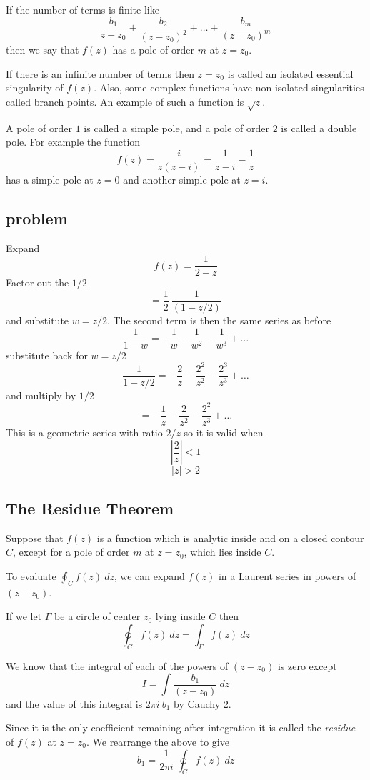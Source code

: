 \documentclass[11pt, oneside]{article}   	%
\begin{document}
If the number of terms is finite like
\[ \frac{b_1}{z-z_0} + \frac{b_2}{(z-z_0)^2} + \dots + \frac{b_m}{(z-z_0)^m} \]
then we say that $f(z)$ has a pole of order $m$ at $ z = z_0$.

If there is an infinite number of terms then $z = z_0$ is called an isolated essential singularity of $f(z)$.  Also, some complex functions have non-isolated singularities called branch points. An example of such a function is $\sqrt{z}$.

A pole of order $1$ is called a simple pole, and a pole of order $2$ is called a double pole.  For example the function
\[ f(z) = \frac{i}{z(z-i)} = \frac{1}{z-i} - \frac{1}{z} \]
has a simple pole at $z = 0$ and another simple pole at $z = i$.  

\subsection*{problem}
Expand 
\[ f(z) = \frac{1}{2 - z} \]
Factor out the $1/2$ 
\[ = \frac{1}{2} \ \frac{1}{(1 - z/2)} \]
and substitute $w = z/2$.  The second term is then the same series as before
\[ \frac{1}{1-w} = - \frac{1}{w} - \frac{1}{w^2} - \frac{1}{w^3} + \dots \]
substitute back for $w = z/2$
\[ \frac{1}{1 - z/2} = - \frac{2}{z} - \frac{2^2}{z^2} - \frac{2^3}{z^3} + \dots \]
and multiply by $1/2$
\[ = - \frac{1}{z} - \frac{2}{z^2} - \frac{2^2}{z^3} + \dots \]
This is a geometric series with ratio $2/z$ so it is valid when
\[ | \frac{2}{z}|  < 1 \]
\[ |z| > 2 \]

\subsection*{The Residue Theorem}
Suppose that $f(z)$ is a function which is analytic inside and on a closed contour $C$, except for a pole of order $m$ at $z=z_0$, which lies inside $C$.

To evaluate $\oint_C f(z) \ dz$, we can expand $f(z)$ in a Laurent series in powers of $(z-z_0)$.  

If we let $\Gamma$ be a circle of center $z_0$ lying inside $C$ then
\[ \oint_C f(z) \ dz = \int_{\Gamma} f(z) \ dz \]

We know that the integral of each of the powers of $(z-z_0)$ is zero except
\[ I = \int \frac{b_1}{(z-z_0)} \ dz \]
and the value of this integral is $2 \pi i \ b_1$ by Cauchy 2.

Since it is the only coefficient remaining after integration it is called the \emph{residue} of $f(z)$ at $z = z_0$.  We rearrange the above to give
\[ b_1 = \frac{1}{2 \pi i} \ \oint_C f(z) \ dz \]
\end{document}
